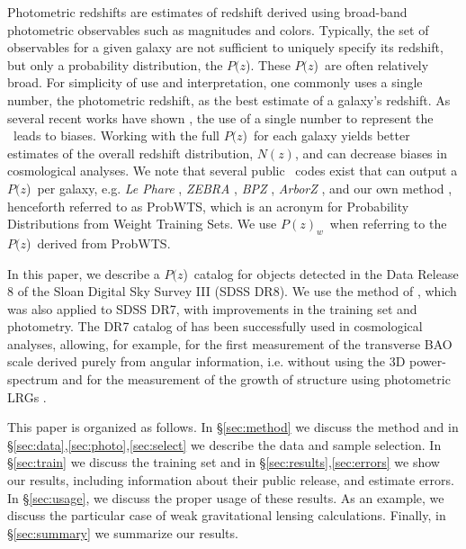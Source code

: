 \documentclass[preprint]{aastex}
\newcommand{\pofz}{$P(z$)}
\newcommand{\pofzw}{$P(z)_w$\ }
\newcommand{\acronym}{ProbWTS}
\begin{document}
Photometric redshifts are estimates of redshift derived using broad-band
photometric observables such as magnitudes and colors.  Typically, the set of
observables for a given galaxy are not sufficient to uniquely specify its
redshift, but only a probability distribution, the \pofz.  These \pofz\ are
often relatively broad. For simplicity of use and interpretation, one commonly
uses a single number, the photometric redshift, as the best estimate of a
galaxy's redshift.  As several recent works have shown
\citep{man08,CunhaPhotoz09,wit09,bor10,abr11}, the use of a single number to
represent the \photoz\ leads to biases.  Working with the full \pofz\ for each
galaxy yields better estimates of the overall redshift distribution, $N(z)$,
and can decrease biases in cosmological analyses.  We note that several public
\photoz\ codes exist that can output a \pofz\ per galaxy, e.g.  {\it Le Phare}
\citep{arn99,ilb06}, {\it ZEBRA} \citep{fel06}, {\it BPZ} \citep{coe06}, {\it
ArborZ} \citep{ger10}, and our own method \citep{CunhaPhotoz09}, henceforth
referred to as \acronym, which is an acronym for Probability Distributions from
Weight Training Sets.  We use \pofzw when referring to the \pofz\  derived from
\acronym.



In this paper, we describe a \pofz\ catalog for objects detected in the Data
Release 8 of the Sloan Digital Sky Survey III (SDSS DR8).  We use the method of
\citet{CunhaPhotoz09}, which was also applied to SDSS DR7, with improvements in
the training set and photometry.  The DR7 catalog of \cite{CunhaPhotoz09} has
been successfully used in cosmological analyses, allowing, for example, for the
first measurement of the transverse BAO scale derived purely from angular
information, i.e. without using the 3D power-spectrum \citep{car11}  and for
the measurement of the growth of structure using photometric LRGs
\citep{cro11}. 

This paper is organized as follows.  In \S \ref{sec:method} we discuss the
method and in \S \ref{sec:data},\ref{sec:photo},\ref{sec:select} we describe
the data and sample selection. In \S \ref{sec:train} we discuss the training
set and in \S \ref{sec:results},\ref{sec:errors} we show our results, including
information about their public release, and
estimate errors.  In \S \ref{sec:usage}, we discuss the proper usage of these
results. As an example, we discuss the particular case of weak gravitational
lensing calculations.  %
Finally, in \S \ref{sec:summary} we summarize our results.
\end{document}
